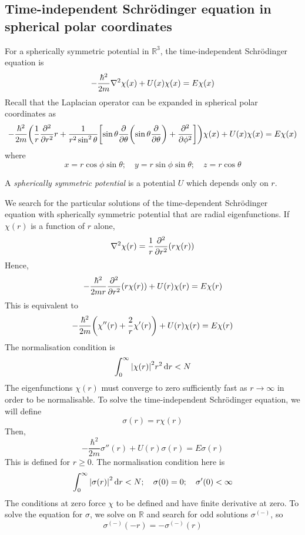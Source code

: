 \subsection{Time-independent Schr\"odinger equation in spherical polar coordinates}
For a spherically symmetric potential in \( \mathbb R^3 \), the time-independent Schr\"odinger equation is
\[
	-\frac{\hbar^2}{2m} \laplacian{\chi(x)} + U(x) \chi(x) = E\chi(x)
\]
Recall that the Laplacian operator can be expanded in spherical polar coordinates as
\[
	-\frac{\hbar^2}{2m} \qty( \frac{1}{r} \pdv[2]{r} r + \frac{1}{r^2\sin^2\theta}\qty[\sin \theta \pdv{\theta}\qty(\sin\theta \pdv{\theta}) + \pdv[2]{\phi}] )\chi(x) + U(x) \chi(x) = E\chi(x)
\]
where
\[
	x = r \cos \phi \sin \theta; \quad y = r \sin \phi \sin \theta;\quad z = r \cos \theta
\]
\begin{definition}
	A \textit{spherically symmetric potential} is a potential \( U \) which depends only on \( r \).
\end{definition}
We search for the particular solutions of the time-dependent Schr\"odinger equation with spherically symmetric potential that are radial eigenfunctions.
If \( \chi(r) \) is a function of \( r \) alone,
\[
	\laplacian{\chi(r)} = \frac{1}{r} \pdv[2]{r} \qty(r\chi(r))
\]
Hence,
\[
	-\frac{\hbar^2}{2mr} \pdv[2]{r} \qty(r \chi(r)) + U(r) \chi(r) = E \chi(r)
\]
This is equivalent to
\[
	-\frac{\hbar^2}{2m} \qty( \chi''(r) + \frac{2}{r} \chi'(r) ) + U(r) \chi(r) = E \chi(r)
\]
The normalisation condition is
\[
	\int_0^\infty \abs{\chi(r)}^2 r^2 \dd{r} < N
\]
The eigenfunctions \( \chi(r) \) must converge to zero sufficiently fast as \( r \to \infty \) in order to be normalisable.
To solve the time-independent Schr\"odinger equation, we will define
\[
	\sigma(r) = r \chi(r)
\]
Then,
\[
	-\frac{\hbar^2}{2m} \sigma''(r) + U(r) \sigma(r) = E \sigma(r)
\]
This is defined for \( r \geq 0 \).
The normalisation condition here is
\[
	\int_0^\infty \abs{\sigma(r)}^2 \dd{r} < N;\quad \sigma(0) = 0;\quad \sigma'(0) < \infty
\]
The conditions at zero force \( \chi \) to be defined and have finite derivative at zero.
To solve the equation for \( \sigma \), we solve on \( \mathbb R \) and search for odd solutions \( \sigma^{(-)} \), so
\[
	\sigma^{(-)}(-r) = -\sigma^{(-)}(r)
\]

